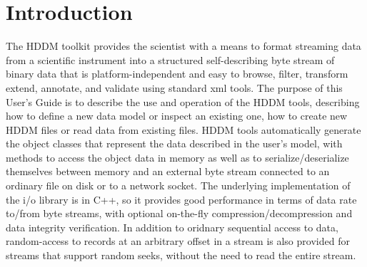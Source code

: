 \documentclass{revtex4}
\begin{document}
%
%
%
%

\section{Introduction}

The HDDM toolkit provides the scientist with a means to format streaming data
from a scientific instrument into a structured self-describing byte stream of
binary data that is platform-independent and easy to browse, filter, transform
extend, annotate, and validate using standard xml tools. The purpose of this 
User's Guide is to describe the use and operation of the HDDM tools, describing
how to define a new data model or inspect an existing one, how to create new
HDDM files or read data from existing files. HDDM tools automatically generate
the object classes that represent the data described in the user's model, with
methods to access the object data in memory as well as to serialize/deserialize
themselves between memory and an external byte stream connected to an ordinary
file on disk or to a network socket. The underlying implementation of the i/o
library is in C++, so it provides good performance in terms of data rate to/from
byte streams, with optional on-{}the-{}fly compression/decompression and data 
integrity verification. In addition to oridnary sequential access to data,
random-{}access to records at an arbitrary offset in a stream is also provided
for streams that support random seeks, without the need to read the entire stream.
\end{document}
